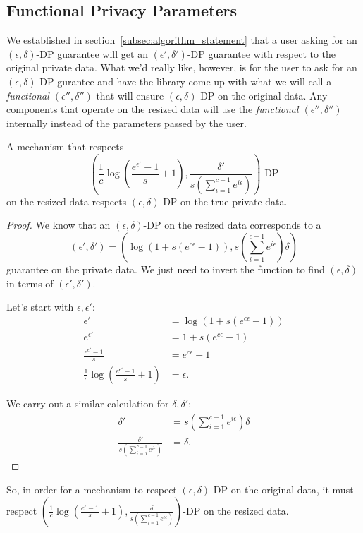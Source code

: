 \documentclass[11pt]{scrartcl} %
\begin{document}
\subsection{Functional Privacy Parameters}
We established in section~\ref{subsec:algorithm_statement} that a user asking for an $(\epsilon, \delta)$-DP guarantee will get an 
$(\epsilon', \delta')$-DP guarantee with respect to the original private data. What we'd really like, however, is for the user to ask for an $(\epsilon, \delta)$-DP 
gurantee and have the library come up with what we will call a \emph{functional $(\epsilon'', \delta'')$} that will ensure $(\epsilon, \delta)$-DP 
on the original data. Any components that operate on the resized data will use the \emph{functional $(\epsilon'', \delta'')$} internally instead of 
the parameters passed by the user.

\begin{theorem}
    A mechanism that respects 
    \[ \left( \frac{1}{c}\log\left(\frac{e^{\epsilon'}-1}{s} + 1 \right), \frac{\delta'}{s\left(\sum_{i=1}^{c-1}e^{i \epsilon}\right)} \right)\text{-DP} \] 
    on the resized data respects $(\epsilon, \delta)$-DP on the true private data.
    \begin{proof}
        We know that an $(\epsilon, \delta)$-DP on the resized data corresponds to a 
        \[ (\epsilon', \delta') = \left(\log\left(1+s\left(e^{c\epsilon}-1\right) \right), s\left(\sum_{i=1}^{c-1}e^{i \epsilon}\right)\delta \right) \]
        guarantee on the private data. We just need to invert the function to find $(\epsilon, \delta)$ in terms of $(\epsilon', \delta')$. \newline 

        Let's start with $\epsilon, \epsilon'$:
        \begin{align*}
            \epsilon' &= \log\left(1+s\left(e^{c\epsilon}-1\right)\right) \\
            e^{\epsilon'} &= 1+s\left(e^{c\epsilon}-1\right) \\
            \frac{e^{\epsilon'}-1}{s} &= e^{c\epsilon}-1 \\
            \frac{1}{c}\log\left(\frac{e^{\epsilon'}-1}{s} + 1 \right) &= \epsilon.
        \end{align*}

        We carry out a similar calculation for $\delta, \delta'$:
        \begin{align*}
            \delta' &= s\left(\sum_{i=1}^{c-1}e^{i \epsilon}\right)\delta \\
            \frac{\delta'}{s\left(\sum_{i=1}^{c-1}e^{i \epsilon}\right)} &= \delta.
        \end{align*}
    \end{proof} 
    So, in order for a mechanism to respect $(\epsilon, \delta)$-DP on the original data, it must respect 
    $\left( \frac{1}{c}\log\left(\frac{e^{\epsilon}-1}{s} + 1 \right), \frac{\delta}{s\left(\sum_{i=1}^{c-1}e^{i \epsilon}\right)} \right)$-DP 
    on the resized data.
\end{theorem}
\end{document}
